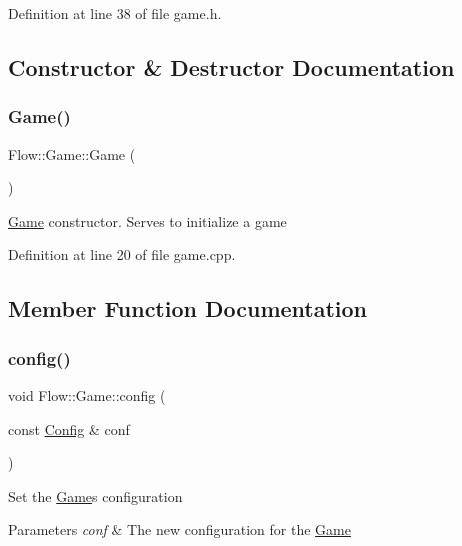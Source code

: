 Definition at line 38 of file game.\+h.



\subsection{Constructor \& Destructor Documentation}
\hypertarget{class_flow_1_1_game_a004f19f00e62d93d91eee232e29ea31c}{}\label{class_flow_1_1_game_a004f19f00e62d93d91eee232e29ea31c} 
\subsubsection{\texorpdfstring{Game()}{Game()}}
{\footnotesize\ttfamily Flow\+::\+Game\+::\+Game (\begin{DoxyParamCaption}{ }\end{DoxyParamCaption})}

\hyperlink{class_flow_1_1_game}{Game} constructor. Serves to initialize a game 

Definition at line 20 of file game.\+cpp.



\subsection{Member Function Documentation}
\hypertarget{class_flow_1_1_game_af5f57d1ab3145d03cf0973b84a5334a6}{}\label{class_flow_1_1_game_af5f57d1ab3145d03cf0973b84a5334a6} 
\subsubsection{\texorpdfstring{config()}{config()}\hspace{0.1cm}{\footnotesize\ttfamily [1/2]}}
{\footnotesize\ttfamily void Flow\+::\+Game\+::config (\begin{DoxyParamCaption}\item[{const \hyperlink{struct_flow_1_1_config}{Config} \&}]{conf }\end{DoxyParamCaption})}

Set the \hyperlink{class_flow_1_1_game}{Game}\textquotesingle{}s configuration 
\begin{DoxyParams}{Parameters}
{\em conf} & The new configuration for the \hyperlink{class_flow_1_1_game}{Game} \\
\hline
\end{DoxyParams}


